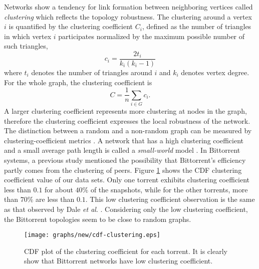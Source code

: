 \documentclass[paper]{ieice}
\begin{document}
Networks show a tendency for link formation between neighboring vertices called \textit{clustering} which reflects the topology robustness.
The clustering around a vertex $i$ is quantified by the clustering coefficient $C_i$, defined as the number of triangles in which vertex $i$ participates normalized by the maximum possible number of such triangles,
\begin{equation}
c_i = \frac{2t_i}{k_i(k_i - 1)} 
\end{equation}
where $t_i$ denotes the number of triangles around $i$ and $k_i$ denotes vertex degree.
For the whole graph, the clustering coefficient is
\begin{equation}
C = \frac{1}{n} \sum_{i \in G} c_i.
\end{equation}
A larger clustering coefficient represents more clustering at nodes in the graph, therefore the clustering coefficient expresses the local robustness of the network.
The distinction between a random and a non-random graph can be measured by clustering-coefficient metrics \cite{watts1998collective}.
A network that has a high clustering coefficient and a small average path length is called a \textit{small-world} model \cite{watts1998collective}.
In Bittorrent systems, a previous study \cite{legout2007clustering} mentioned the possibility that Bittorrent's efficiency partly comes from the clustering of peers.
Figure \ref{fig:cdf-clustering} shows the CDF clustering coefficient value of our data sets.
Only one torrent exhibits clustering coefficient less than $0.1$ for about $40\%$ of the snapshots, while for the other torrents, more than  $70\%$ are less than $0.1$.
This low clustering coefficient observation is the same as that observed by Dale \textit{et al}. \cite{dale2008evolution}.
Considering only the low clustering coefficient, the Bittorrent topologies seem to be close to random graphs.

\begin{figure}[!tb]
\begin{center}
\texttt{[image: graphs/new/cdf-clustering.eps]}
\end{center}
\caption{CDF plot of the clustering coefficient for each torrent. It is clearly show that Bittorrent networks have low clustering coefficient.} 
\label{fig:cdf-clustering}
\vspace{-5mm}
\end{figure}
\end{document}
